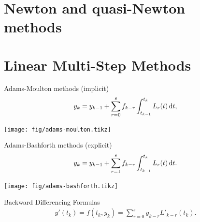 \documentclass[USEnglish,ignorenonframetext,notheorems,aspectratio=1610]{beamer}
\def\lmms{s}
\begin{document}

\section{Newton and quasi-Newton methods}



\section{Linear Multi-Step Methods}

\begin{frame}
  \begin{block}{Adams-Moulton methods (implicit)}
  \begin{gather*}
    y_k = y_{k-1} + \sum_{r=0}^\lmms f_{k-r} \int_{t_{k-1}}^{t_k}
    L_r(t) \dt,
  \end{gather*}
    \begin{center}
      \texttt{[image: fig/adams-moulton.tikz]}
    \end{center}
        
  \end{block}
\end{frame}
\begin{frame}
  \begin{block}{Adams-Bashforth methods (explicit)}
  \begin{gather*}
    y_k = y_{k-1} + \sum_{r=1}^\lmms f_{k-r} \int_{t_{k-1}}^{t_k}
    L_r(t) \dt.
  \end{gather*}
    \begin{center}
      \texttt{[image: fig/adams-bashforth.tikz]}
    \end{center}
    
  \end{block}
\end{frame}
\begin{frame}
  \begin{block}{Backward Differencing Formulas}
  \begin{gather*}
    y'(t_k) = f(t_k, y_k) = \sum_{r=0}^\lmms y_{k-r} L'_{k-r}(t_k).
  \end{gather*}
    
  \end{block}
\end{frame}
\end{document}
